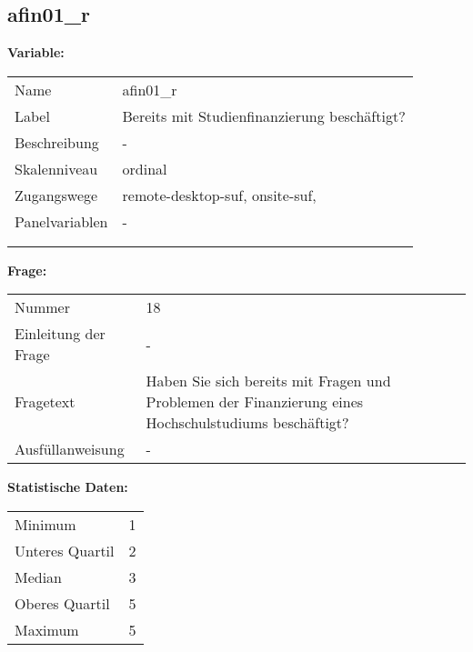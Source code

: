 	
	
	\subsection{afin01\_r}
	\label{subSection:afin01_r}

	\noindent\textbf{Variable:}\\
		\begin{tabular}{lL{11.3cm}}
			\label{tableVariable:afin01_r}
			Name & afin01\_r \\
			Label & Bereits mit Studienfinanzierung beschäftigt? \\
			Beschreibung & - \\
			Skalenniveau & ordinal \\
			Zugangswege &
				remote-desktop-suf,
				onsite-suf,
 \\
			Panelvariablen & -
			 \\
			 \\
 \\
		\end{tabular}

		\vspace*{1 cm}
		\noindent\textbf{Frage:}\\
		\begin{tabular}{lL{11.3cm}}
			\label{tableQuestion:afin01_r}
			Nummer & 18 \\
			Einleitung der Frage & - \\
			Fragetext & Haben Sie sich bereits mit Fragen und Problemen der Finanzierung eines Hochschulstudiums beschäftigt? \\
			Ausfüllanweisung & - \\
		\end{tabular}


		\vspace*{1 cm}
		\noindent\textbf{Statistische Daten:}\\
			\begin{tabular}{ll}
				\label{tableStatistics:afin01_r}
					Minimum & 1 \\
					Unteres Quartil & 2 \\
					Median & 3 \\
					Oberes Quartil & 5 \\
					Maximum & 5 \\
			\end{tabular}



